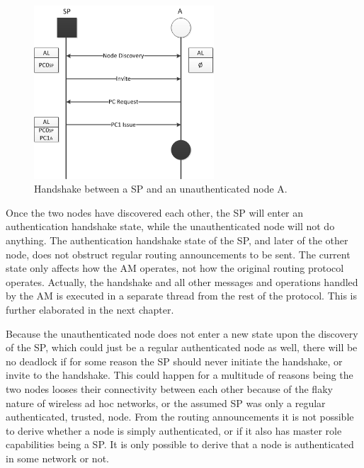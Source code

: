 \begin{figure}[h]
	\centering
  	\includegraphics[width=0.6\textwidth]{images/node_states_handshake.png}
  	\caption{Handshake between a \acf{SP} and an unauthenticated node A.}
	\label{fig:node_states_handshake}
\end{figure}

Once the two nodes have discovered each other, the \ac{SP} will enter an
authentication handshake state, while the unauthenticated node will not do
anything. The authentication handshake state of the \ac{SP}, and later of the
other node, does not obstruct regular routing announcements to be sent. The
current state only affects how the \ac{AM} operates, not how the original
routing protocol operates. Actually, the handshake and all other messages and
operations handled by the \ac{AM} is executed in a separate thread from the rest
of the protocol. This is further elaborated in the next chapter.

Because the unauthenticated node does not enter a new state upon the discovery
of the \ac{SP}, which could just be a regular authenticated node as well, there
will be no deadlock if for some reason the \ac{SP} should never initiate the
handshake, or invite to the handshake. This could happen for a multitude of
reasons being the two nodes looses their connectivity between each other
because of the flaky nature of wireless ad hoc networks, or the assumed \ac{SP}
was only a regular authenticated, trusted, node. From the routing announcements
it is not possible to derive whether a node is simply authenticated, or if it
also has master role capabilities being a \ac{SP}. It is only possible to
derive that a node is authenticated in some network or not.


